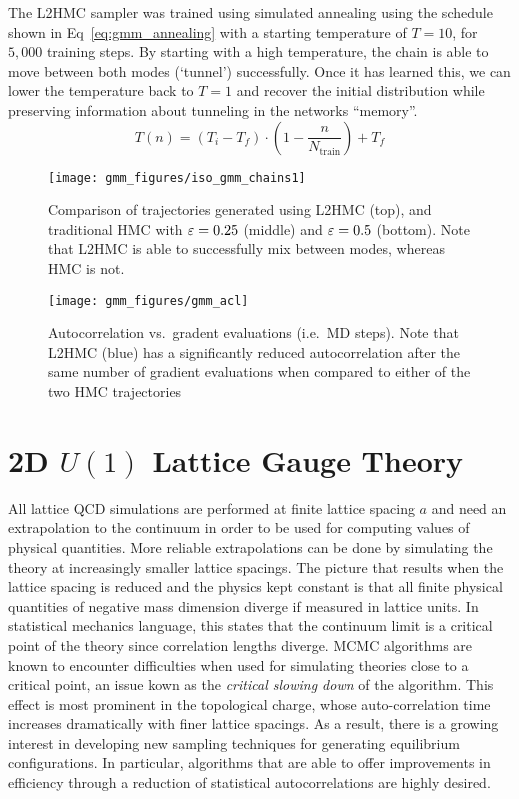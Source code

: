 \documentclass[../main.tex]{subfiles}
\begin{document}
%
The L2HMC sampler was trained using simulated annealing using the schedule shown in Eq~\ref{eq:gmm_annealing} with a
starting temperature of $T = 10$, for $5,000$ training steps.
%
By starting with a high temperature, the chain is able to move between both modes (`tunnel') successfully.
%
Once it has learned this, we can lower the temperature back to $T = 1$ and recover the initial distribution while
preserving information about tunneling in the networks ``memory''.
%
\begin{equation}
  T(n) = {\left(T_{i} - T_{f}\right)} \cdot {\left(1 - \frac{n}{N_{\mathrm{train}}}\right)} + T_{f}
  \label{eq:gmm_annealing}
\end{equation}
%
\begin{figure}[htbp]
    \centering
    \texttt{[image: gmm\_figures/iso\_gmm\_chains1]}
    \caption{Comparison of trajectories generated using L2HMC (top), and
        traditional HMC with ${\varepsilon} = 0.25$ (middle) and ${\varepsilon} = 0.5$ (bottom).
        Note that L2HMC is able to successfully mix between modes, whereas HMC
        is not.}%
\label{fig:gmm_trajectories}
\end{figure}
%
\begin{figure}[htbp]
    \centering
    \texttt{[image: gmm\_figures/gmm\_acl]}
    \caption{Autocorrelation vs.\ gradent evaluations (i.e.\ MD steps). Note that L2HMC (blue) has a significantly
      reduced autocorrelation after the same number of gradient evaluations when compared to either of the two HMC
    trajectories}%
\label{fig:gmm_autocorrelation}
\end{figure}
%
\section{2D \texorpdfstring{$U(1)$}{U (1)} Lattice Gauge Theory}%
\label{sec:l2hmc_u1}
All lattice QCD simulations are performed at finite lattice spacing $a$ and need an extrapolation to the continuum in
order to be used for computing values of physical quantities.
%
More reliable extrapolations can be done by simulating the theory at increasingly smaller lattice spacings.
%
The picture that results when the lattice spacing is reduced and the physics kept constant is that all finite physical
quantities of negative mass dimension diverge if measured in lattice units.
%
In statistical mechanics language, this states that the continuum limit is a critical point of the theory since
correlation lengths diverge.
%
MCMC algorithms are known to encounter difficulties when used for simulating theories close to a critical point, an
issue kown as the \emph{critical slowing down} of the algorithm.
%
This effect is most prominent in the topological charge, whose auto-correlation time increases dramatically with finer
lattice spacings.
%
As a result, there is a growing interest in developing new sampling techniques for generating equilibrium
configurations. 
%
In particular, algorithms that are able to offer improvements in efficiency through a reduction of statistical
autocorrelations are highly desired. 
%
\end{document}
